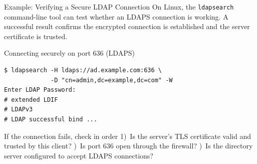 \documentclass[aspectratio=169]{beamer}  %
\begin{document}
\begin{frame}[fragile]{Example: Verifying a Secure LDAP Connection}
    \footnotesize
    On Linux, the \texttt{ldapsearch} command-line tool can test whether an LDAPS connection is working. A successful result confirms the encrypted connection is established and the server certificate is trusted.

    \vspace{0.4em}
    \begin{exampleblock}{Connecting securely on port 636 (LDAPS)}
        \scriptsize
\begin{verbatim}
$ ldapsearch -H ldaps://ad.example.com:636 \
             -D "cn=admin,dc=example,dc=com" -W
Enter LDAP Password:
# extended LDIF
# LDAPv3
# LDAP successful bind ...
\end{verbatim}
    \end{exampleblock}

    \begin{alertblock}{If the connection fails, check in order}
        \footnotesize
        1)~Is the server's TLS certificate valid and trusted by this client? \quad
        2)~Is port 636 open through the firewall? )~Is the directory server configured to accept LDAPS connections?
    \end{alertblock}
\end{frame}
\end{document}
